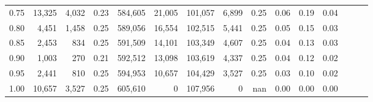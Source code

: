 \begin{tabular}{rrrrrrrrrrrrrrr}
0.75 &  13,325 &   4,032 &  0.23 &  584,605 &   21,005 &  101,057 &    6,899 &  0.25 &  0.06 &  0.19 &      0.04 \\
0.80 &   4,451 &   1,458 &  0.25 &  589,056 &   16,554 &  102,515 &    5,441 &  0.25 &  0.05 &  0.15 &      0.03 \\
0.85 &   2,453 &     834 &  0.25 &  591,509 &   14,101 &  103,349 &    4,607 &  0.25 &  0.04 &  0.13 &      0.03 \\
0.90 &   1,003 &     270 &  0.21 &  592,512 &   13,098 &  103,619 &    4,337 &  0.25 &  0.04 &  0.12 &      0.02 \\
0.95 &   2,441 &     810 &  0.25 &  594,953 &   10,657 &  104,429 &    3,527 &  0.25 &  0.03 &  0.10 &      0.02 \\
1.00 &  10,657 &   3,527 &  0.25 &  605,610 &        0 &  107,956 &        0 &   nan &  0.00 &  0.00 &      0.00 \\
\bottomrule
\end{tabular}
